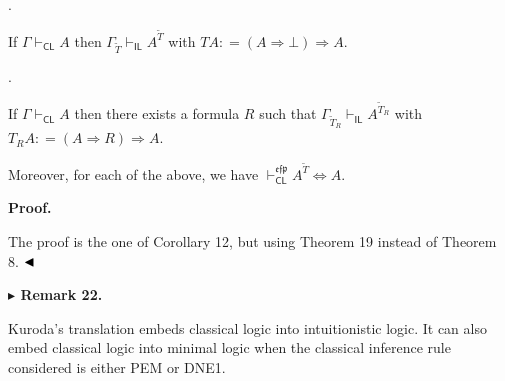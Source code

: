 \documentclass[10pt,a4paper]{article}
\begin{document}
 
 
\par{}. 
 
If $\Gamma\vdash_{\mathsf{CL}}A$ then $\Gamma_{\widetilde{T}}\vdash_{\mathsf{IL}}A^{\widetilde{T}}$ with $TA\mathrel{\mathop{:}}=(A\mathbin{\Rightarrow}\bot)\mathbin{\Rightarrow}A$.\par
 
 
 
\par{}. 
 
If $\Gamma\vdash_{\mathsf{CL}}A$ then there exists a formula $R$ such that $\Gamma_{\widetilde{T}_{R}}\vdash_{\mathsf{IL}}A^{\widetilde{T}_{R}}$ with $T_{R}A\mathrel{\mathop{:}}=(A\mathbin{\Rightarrow}R)\mathbin{\Rightarrow}A$.\par
 
 
  
Moreover, for each of the above, we have $\vdash_{\mathsf{CL}}^{\mathfrak{e}\mathfrak{f}\mathfrak{p}}A^{\widetilde{T}}\Leftrightarrow
A$.\par
 
 
 
 
\par\medskip\noindent\textbf{Proof.}\par
 
 
The proof is the one of Corollary 12, but using Theorem 19 instead of Theorem 8. $\hfill\blacktriangleleft$\par
 
 
 
\par\medskip\noindent\textbf{$\blacktriangleright$ Remark 22.}\par
 
 
Kuroda’s translation embeds classical logic into intuitionistic logic. It can also embed classical logic into minimal logic when the classical inference rule considered is either PEM or DNE1.\par
 
 
 
\end{document}

